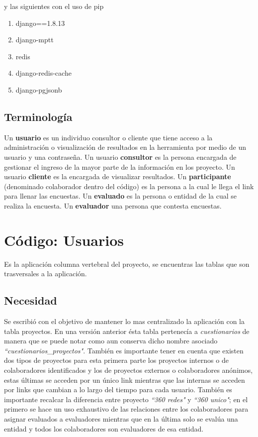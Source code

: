 \documentclass[10pt,a4paper]{book}
\begin{document}
	y las siguientes con el uso de pip
	\begin{enumerate}
		\item django==1.8.13 
		\item django-mptt 
		\item redis 
		\item django-redis-cache
		\item django-pgjsonb
	\end{enumerate}
	
	\section{Terminología}
	Un \textbf{usuario} es un individuo consultor o cliente que tiene acceso a la administración o visualización de resultados en la herramienta por medio de un usuario y una contraseña. Un usuario \textbf{consultor} es la persona encargada de gestionar el ingreso de la mayor parte de la información en los proyecto. Un usuario \textbf{cliente} es la encargada de visualizar resultados. Un \textbf{participante} (denominado colaborador dentro del código) es la persona a la cual le llega el link para llenar las encuestas. Un \textbf{evaluado} es la persona o entidad de la cual se realiza la encuesta. Un \textbf{evaluador} una persona que contesta encuestas.
	
	\chapter{Código: Usuarios}
		
	Es la aplicación columna vertebral del proyecto, se encuentras las tablas que son trasversales a la aplicación.

	\section{Necesidad}
	
	Se escribió con el objetivo de mantener lo mas centralizado la aplicación con la tabla proyectos. En una versión anterior ésta tabla pertenecía a \textit{cuestionarios} de manera que se puede notar como aun conserva dicho nombre asociado \textit{``cuestionarios\_proyectos"}. También es importante tener en cuenta que existen dos tipos de proyectos para esta primera parte los proyectos internos o de colaboradores identificados y los de proyectos externos o colaboradores anónimos, estas últimas se acceden por un único link mientras que las internas se acceden por links que cambian a lo largo del tiempo para cada usuario. También es importante recalcar la diferencia entre proyecto \textit{``360 redes"} y \textit{``360 unico"}; en el primero se hace un uso exhaustivo de las relaciones entre los colaboradores para asignar evaluados a evaluadores mientras que en la última solo se evalúa una entidad y todos los colaboradores son evaluadores de esa entidad.
	
\end{document}
